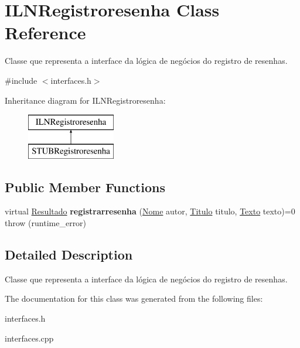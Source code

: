 \hypertarget{classILNRegistroresenha}{}\section{I\+L\+N\+Registroresenha Class Reference}
\label{classILNRegistroresenha}


Classe que representa a interface da lógica de negócios do registro de resenhas.  




{\ttfamily \#include $<$interfaces.\+h$>$}

Inheritance diagram for I\+L\+N\+Registroresenha\+:\begin{figure}[H]
\begin{center}
\leavevmode
\includegraphics[height=2.000000cm]{classILNRegistroresenha}
\end{center}
\end{figure}
\subsection*{Public Member Functions}
\begin{DoxyCompactItemize}
\item 
\mbox{\label{classILNRegistroresenha_a90932bda484da22abdfacdea9c3b080d}} 
virtual \hyperlink{classResultado}{Resultado} {\bfseries registrarresenha} (\hyperlink{classNome}{Nome} autor, \hyperlink{classTitulo}{Titulo} titulo, \hyperlink{classTexto}{Texto} texto)=0  throw (runtime\+\_\+error)
\end{DoxyCompactItemize}


\subsection{Detailed Description}
Classe que representa a interface da lógica de negócios do registro de resenhas. 

The documentation for this class was generated from the following files\+:\begin{DoxyCompactItemize}
\item 
interfaces.\+h\item 
interfaces.\+cpp\end{DoxyCompactItemize}
